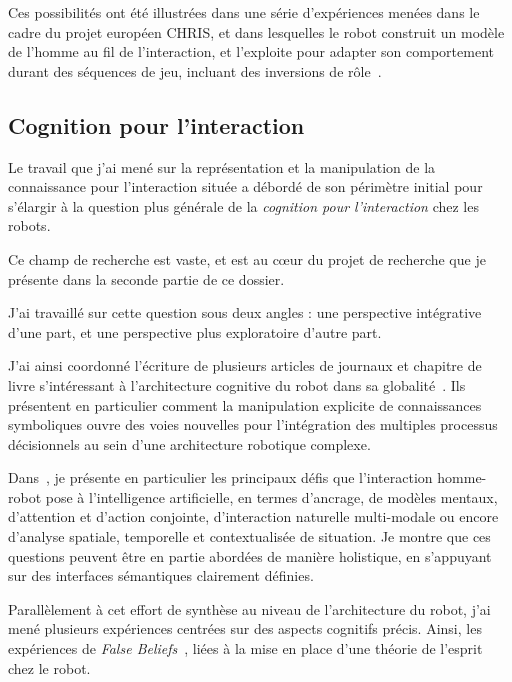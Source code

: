 \documentclass[a4paper]{article}
\begin{document}
Ces possibilités ont été illustrées dans une série d'expériences menées dans le
cadre du projet européen CHRIS, et dans lesquelles le robot construit un modèle de
l'homme au fil de l'interaction, et l'exploite pour adapter son comportement durant
des séquences de jeu, incluant des inversions de rôle~\cite{Lallee2010b,
Lallee2011, Lallee2012}.



\subsection{Cognition pour l'interaction%
  \label{cognition-for-interaction}%
}

Le travail que j'ai mené sur la représentation et la manipulation de la
connaissance pour l'interaction située a débordé de son périmètre
initial pour s'élargir à la question plus générale de la \emph{cognition pour
l'interaction} chez les robots.

Ce champ de recherche est vaste, et est au c\oe ur du projet de recherche que je
présente dans la seconde partie de ce dossier.

J'ai travaillé sur cette question sous deux angles : une perspective
intégrative d'une part, et une perspective plus exploratoire d'autre part.

J'ai ainsi coordonné l'écriture de plusieurs articles de journaux et chapitre de
livre s'intéressant à l'architecture cognitive du robot dans sa
globalité~\cite{alami2011when, Lemaignan2012, lemaignan2014human}. Ils
présentent en particulier comment la manipulation explicite de connaissances
symboliques ouvre des voies nouvelles pour l'intégration des multiples processus
décisionnels au sein d'une architecture robotique complexe.

Dans~\cite{lemaignan2014human}, je présente en particulier les
principaux défis que l'interaction homme-robot pose à l'intelligence
artificielle, en termes d'ancrage, de modèles mentaux, d'attention et
d'action conjointe, d'interaction naturelle multi-modale ou encore d'analyse
spatiale, temporelle et contextualisée de situation. Je montre que ces
questions peuvent être en partie abordées de manière holistique, en s'appuyant
sur des interfaces sémantiques clairement définies.

Parallèlement à cet effort de synthèse au niveau de l'architecture du
robot, j'ai mené plusieurs expériences centrées sur des aspects cognitifs
précis. Ainsi, les expériences de \emph{False Beliefs}~\cite{warnier2012when},
liées à la mise en place d'une théorie de l'esprit chez le robot.
\end{document}
